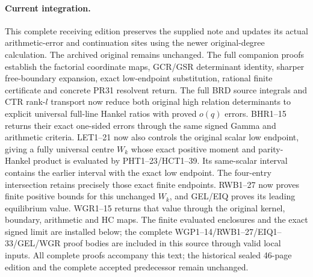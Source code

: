 \documentclass[11pt,a4paper]{article}
\begin{document}
\paragraph{Current integration.}
This complete receiving edition preserves the supplied note and updates
its actual arithmetic-error and continuation sites using the newer
original-degree calculation. The archived original remains unchanged.
The full companion proofs establish the factorial coordinate maps,
GCR/GSR determinant identity, sharper free-boundary expansion,
exact low-endpoint substitution, rational finite certificate and
concrete PR31 resolvent return. The full BRD source integrals
and CTR rank-$l$ transport now reduce both original high relation
determinants to explicit universal full-line Hankel ratios with
proved $o(q)$ errors. BHR1--15 returns their exact one-sided
errors through the same signed Gamma and arithmetic criteria.
LET1--21 now also controls the original scalar low endpoint,
giving a fully universal centre $W_k$ whose exact positive
moment and parity-Hankel product is evaluated by PHT1--23/HCT1--39.
Its same-scalar interval contains the earlier interval with
the exact low endpoint. The four-entry intersection retains precisely
those exact finite endpoints. RWB1--27 now proves finite positive
bounds for this unchanged $W_k$, and GEL/EIQ proves its leading
equilibrium value. WGR1--15 returns that value through the original
kernel, boundary, arithmetic and HC maps. The finite evaluated
enclosures and the exact signed limit are installed below; the
complete WGP1--14/RWB1--27/EIQ1--33/GEL/WGR proof bodies are
included in this source through valid local inputs.
All complete proofs accompany this text; the historical sealed
46-page edition and the complete accepted predecessor remain unchanged.
\tableofcontents
\end{document}

